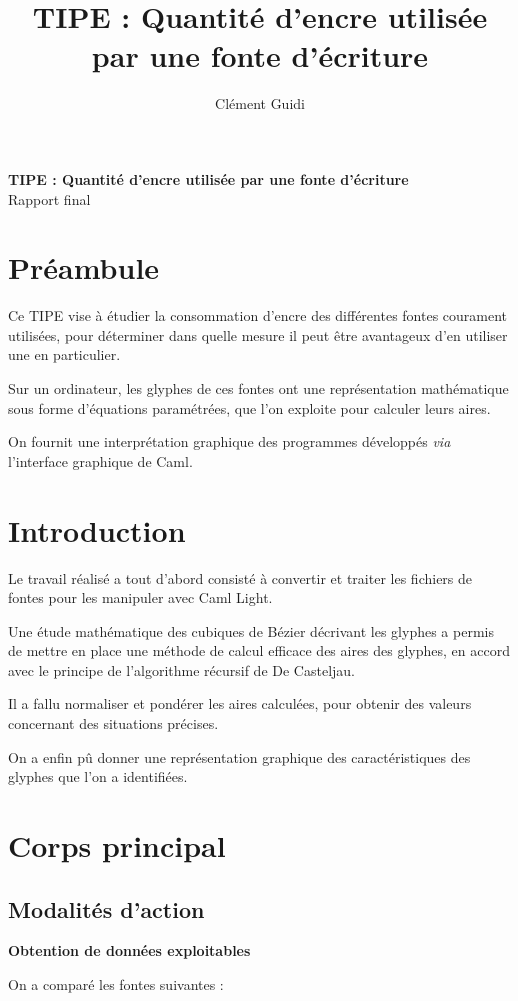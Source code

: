 \documentclass[10pt,twoside,french,a4paper]{article}
\title{TIPE : Quantité d'encre utilisée par une fonte d'écriture}
\author{Clément Guidi}
\begin{document}
\begin{center}
  \LARGE \textbf{TIPE : Quantité d'encre utilisée par une fonte d'écriture} \\ Rapport final
\end{center}

\section{Préambule}

Ce TIPE vise à étudier la consommation d'encre des différentes fontes courament utilisées, pour déterminer dans quelle mesure il peut être avantageux d'en utiliser une en particulier.

Sur un ordinateur, les glyphes de ces fontes ont une représentation mathématique sous forme d'équations paramétrées, que l'on exploite pour calculer leurs aires.

On fournit une interprétation graphique des programmes développés \textit{via} l'interface graphique de Caml.

\section{Introduction}

Le travail réalisé a tout d'abord consisté à convertir et traiter les fichiers de fontes pour les manipuler avec Caml Light.

Une étude mathématique des cubiques de Bézier décrivant les glyphes a permis de mettre en place une méthode de calcul efficace des aires des glyphes, en accord avec le principe de l'algorithme récursif de De Casteljau.

Il a fallu normaliser et pondérer les aires calculées, pour obtenir des valeurs concernant des situations précises.

On a enfin pû donner une représentation graphique des caractéristiques des glyphes que l'on a identifiées.

\section{Corps principal}

\subsection{Modalités d’action}

\noindent \textbf{Obtention de données exploitables}

On a comparé les fontes suivantes :
\end{document}
